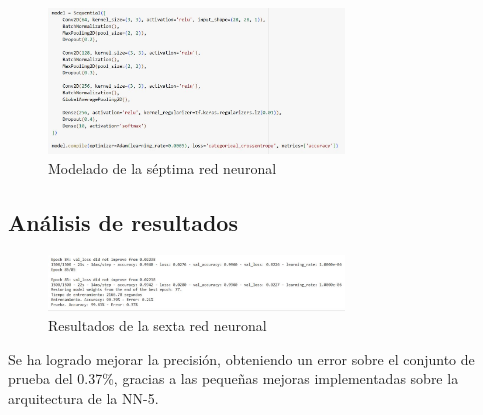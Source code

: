 \begin{figure}[H]
	\centering
	\includegraphics[width=0.7\textwidth]{imgs/model-red7.JPG}
	\caption{Modelado de la séptima red neuronal}
	\label{fig:model-red7}
\end{figure}

\subsection{Análisis de resultados}

\begin{figure}[H]
	\centering
	\includegraphics[width=0.7\textwidth]{imgs/results-red7.JPG}
	\caption{Resultados de la sexta red neuronal}
	\label{fig:results-red7}
\end{figure}

Se ha logrado mejorar la precisión, obteniendo un error sobre el conjunto de prueba del 0.37\%, gracias a las pequeñas mejoras implementadas sobre la arquitectura de la NN-5.
